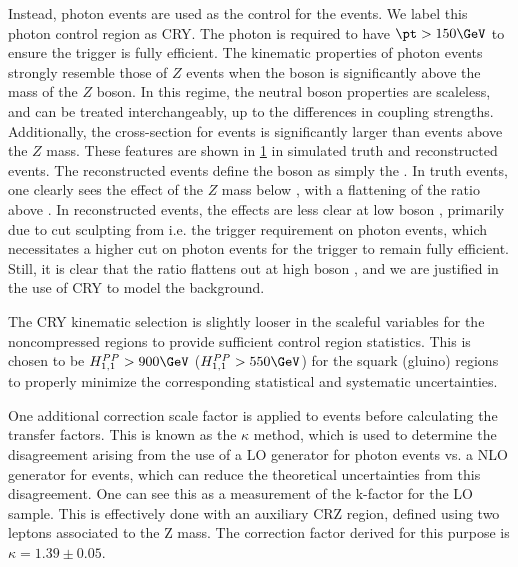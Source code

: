 Instead, photon events are used as the control for the \Zvv events.
We label this photon control region as CRY.
The photon is required to have $\pt > 150 \GeV$ to ensure the trigger is fully efficient.
The kinematic properties of photon events strongly resemble those of $Z$ events when the boson \pt is significantly above the mass of the $Z$ boson.
In this regime, the neutral boson properties are scaleless, and can be treated interchangeably, up to the differences in coupling strengths.
Additionally, the cross-section for \gammajets events is significantly larger than \zjets events above the $Z$ mass.
These features are shown in \ref{fig:boson_pt_ratio} in simulated \Zvv truth and reconstructed events.
The reconstructed \Zvv events define the boson \pt as simply the \met.
In truth events, one clearly sees the effect of the $Z$ mass below  \GeV, with a flattening of the ratio above  \GeV.
In reconstructed events, the effects are less clear at low boson \pt, primarily due to cut sculpting from i.e. the trigger requirement on photon events, which necessitates a higher \pt cut on photon events for the trigger to remain fully efficient.
Still, it is clear that the ratio flattens out at high boson \pt, and we are justified in the use of CRY to model the \zjets background.

The CRY kinematic selection is slightly looser in the scaleful variables for the noncompressed regions to provide sufficient control region statistics.
This is chosen to be $\HFnm{PP}{1}{1} > 900 \GeV$ ($\HFnm{PP}{1}{1} > 550 \GeV$) for the squark (gluino) regions to properly minimize the corresponding statistical and systematic uncertainties.
\begin{figure}
\caption{} \label{fig:boson_pt_ratio}
\end{figure}

One additional correction scale factor is applied to \gammajets events before calculating the transfer factors.
This is known as the $\kappa$ method, which is used to determine the disagreement arising from the use of a LO generator for photon events vs. a NLO generator for \zjets events, which can reduce the theoretical uncertainties from this disagreement.
One can see this as a measurement of the k-factor for the LO \gammajets sample.
This is effectively done with an auxiliary CRZ region, defined using two leptons associated to the Z mass.
The correction factor derived for this purpose is $\kappa = 1.39 \pm 0.05$.

